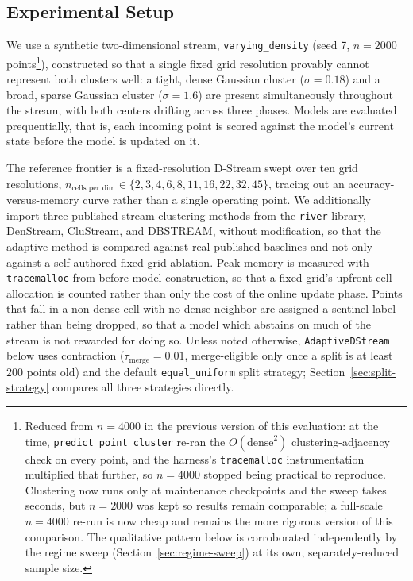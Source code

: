 \documentclass[11pt]{article}
\begin{document}
\subsection{Experimental Setup}

We use a synthetic two-dimensional stream, \texttt{varying\_density} (seed 7, $n=2000$ points\footnote{Reduced from $n=4000$ in the previous version of this evaluation: at the time, \texttt{predict\_point\_cluster} re-ran the $O(\text{dense}^2)$ clustering-adjacency check on every point, and the harness's \texttt{tracemalloc} instrumentation multiplied that further, so $n=4000$ stopped being practical to reproduce. Clustering now runs only at maintenance checkpoints and the sweep takes seconds, but $n=2000$ was kept so results remain comparable; a full-scale $n=4000$ re-run is now cheap and remains the more rigorous version of this comparison. The qualitative pattern below is corroborated independently by the regime sweep (Section~\ref{sec:regime-sweep}) at its own, separately-reduced sample size.}), constructed so that a single fixed grid resolution provably cannot represent both clusters well: a tight, dense Gaussian cluster ($\sigma = 0.18$) and a broad, sparse Gaussian cluster ($\sigma = 1.6$) are present simultaneously throughout the stream, with both centers drifting across three phases. Models are evaluated prequentially, that is, each incoming point is scored against the model's current state before the model is updated on it.

The reference frontier is a fixed-resolution D-Stream swept over ten grid resolutions, $n_{\text{cells per dim}} \in \{2,3,4,6,8,11,16,22,32,45\}$, tracing out an accuracy-versus-memory curve rather than a single operating point. We additionally import three published stream clustering methods from the \texttt{river} library, DenStream, CluStream, and DBSTREAM, without modification, so that the adaptive method is compared against real published baselines and not only against a self-authored fixed-grid ablation. Peak memory is measured with \texttt{tracemalloc} from before model construction, so that a fixed grid's upfront cell allocation is counted rather than only the cost of the online update phase. Points that fall in a non-dense cell with no dense neighbor are assigned a sentinel label rather than being dropped, so that a model which abstains on much of the stream is not rewarded for doing so. Unless noted otherwise, \texttt{AdaptiveDStream} below uses contraction ($\tau_{\text{merge}}=0.01$, merge-eligible only once a split is at least $200$ points old) and the default \texttt{equal\_uniform} split strategy; Section~\ref{sec:split-strategy} compares all three strategies directly.
\end{document}
